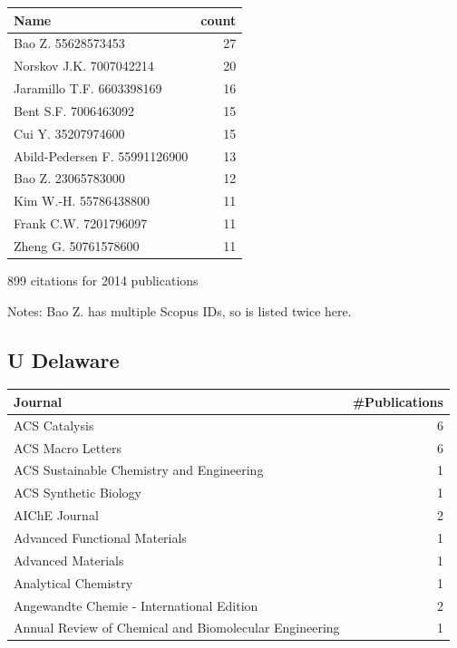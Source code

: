 \documentclass[11pt]{article}
\begin{document}
\begin{center}
\begin{tabular}{lr}
Name & count\\
\hline
Bao Z. 55628573453 & 27\\
Norskov J.K. 7007042214 & 20\\
Jaramillo T.F. 6603398169 & 16\\
Bent S.F. 7006463092 & 15\\
Cui Y. 35207974600 & 15\\
Abild-Pedersen F. 55991126900 & 13\\
Bao Z. 23065783000 & 12\\
Kim W.-H. 55786438800 & 11\\
Frank C.W. 7201796097 & 11\\
Zheng G. 50761578600 & 11\\
\end{tabular}
\end{center}

899 citations for 2014 publications

Notes: Bao Z. has multiple Scopus IDs, so is listed twice here.

\subsection{U Delaware}
\label{sec-1-8}
\begin{center}
\begin{tabular}{lr}
Journal & \#Publications\\
\hline
ACS Catalysis & 6\\
ACS Macro Letters & 6\\
ACS Sustainable Chemistry and Engineering & 1\\
ACS Synthetic Biology & 1\\
AIChE Journal & 2\\
Advanced Functional Materials & 1\\
Advanced Materials & 1\\
Analytical Chemistry & 1\\
Angewandte Chemie - International Edition & 2\\
Annual Review of Chemical and Biomolecular Engineering & 1\\
\end{tabular}
\end{center}
\end{document}
